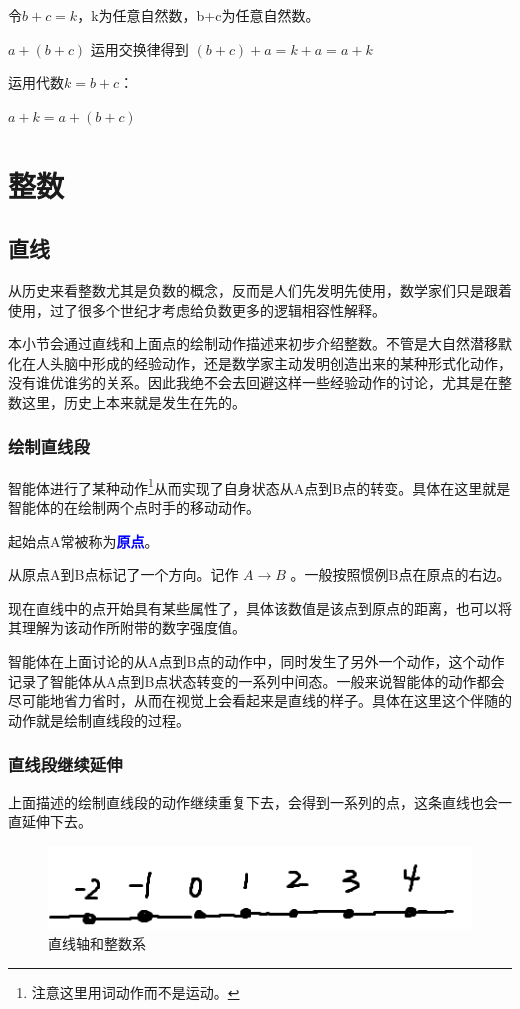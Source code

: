 \documentclass[12pt,oneside]{book}
\renewcommand{\emph}[1]{\textcolor{blue}{\textbf{#1}}}
\begin{document}
令$b+c=k$，k为任意自然数，b+c为任意自然数。

$a+ (b + c)$ 运用交换律得到 $(b+c) +a = k+a = a+k$

运用代数$k=b+c$：

$a+k = a+ (b+c)$

\chapter{整数}
\section{直线}
从历史来看整数尤其是负数的概念，反而是人们先发明先使用，数学家们只是跟着使用，过了很多个世纪才考虑给负数更多的逻辑相容性解释\cite{高观点下的初等数学第一卷}。

本小节会通过直线和上面点的绘制动作描述来初步介绍整数。不管是大自然潜移默化在人头脑中形成的经验动作，还是数学家主动发明创造出来的某种形式化动作，没有谁优谁劣的关系。因此我绝不会去回避这样一些经验动作的讨论，尤其是在整数这里，历史上本来就是发生在先的。


\subsection{绘制直线段}
智能体进行了某种动作\footnote{注意这里用词动作而不是运动。}从而实现了自身状态从A点到B点的转变。具体在这里就是智能体的在绘制两个点时手的移动动作。

起始点A常被称为\emph{原点}。

从原点A到B点标记了一个方向。记作 $A \to B$ 。一般按照惯例B点在原点的右边。

现在直线中的点开始具有某些属性了，具体该数值是该点到原点的距离，也可以将其理解为该动作所附带的数字强度值。

智能体在上面讨论的从A点到B点的动作中，同时发生了另外一个动作，这个动作记录了智能体从A点到B点状态转变的一系列中间态。一般来说智能体的动作都会尽可能地省力省时，从而在视觉上会看起来是直线的样子。具体在这里这个伴随的动作就是绘制直线段的过程。

\subsection{直线段继续延伸}
上面描述的绘制直线段的动作继续重复下去，会得到一系列的点，这条直线也会一直延伸下去。

\begin{figure}[H]
\centering
\includegraphics[width=\linewidth ,totalheight=0.95\textheight , keepaspectratio]{直线轴和整数系.png}
\caption{直线轴和整数系}
\end{figure}
\end{document}
